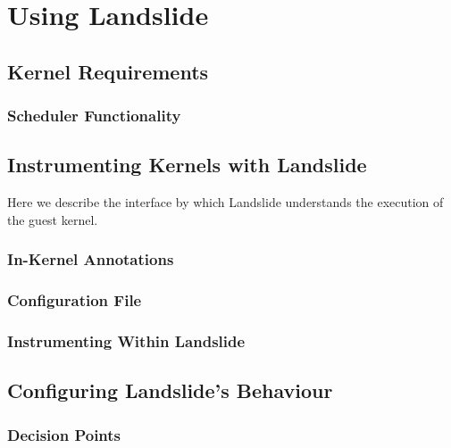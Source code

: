 \chapter{Using Landslide}
\label{sec:using}

\section{Kernel Requirements}
\label{sec:using-requirements}

\subsection{Scheduler Functionality}
\label{sec:using-requirements-sched}

\section{Instrumenting Kernels with Landslide}
\label{sec:using-instrumenting}

Here we describe the interface by which Landslide understands the execution of the guest kernel.

\subsection{In-Kernel Annotations}
\label{sec:using-annotations}

\subsection{Configuration File}
\label{sec:using-config-landslide}

\subsection{Instrumenting Within Landslide}
\label{sec:using-student-c}


\section{Configuring Landslide's Behaviour}
\label{sec:using-customise}
\subsection{Decision Points}
\label{sec:using-decision}
